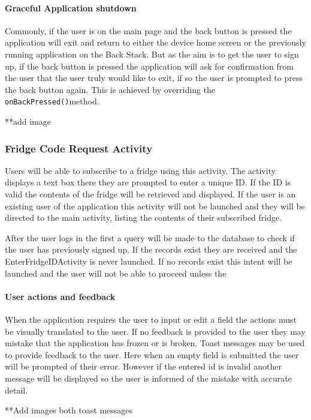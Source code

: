 \documentclass[a4paper, 11pt]{article}
\begin{document}
\paragraph{Graceful Application shutdown}
Commonly, if the user is on the main page and the back button is pressed the application will exit and return to either the device home screen or the previously running application on the Back Stack. But as the aim is to get the user to sign up, if the back button is pressed the application will ask for confirmation from the user that the user truly would like to exit, if so the user is prompted to press the back button again. This is achieved by overriding the \texttt{onBackPressed()}method. 

**add image


\subsubsection{Fridge Code Request Activity}
Users will be able to subscribe to a fridge using this activity. The activity displays a text box there they are prompted to enter a unique ID. If the ID is valid the contents of the fridge will be retrieved and displayed. If the user is an existing user of the application this activity will not be launched and they will be directed to the main activity, listing the contents of their subscribed fridge.

After the user logs in the first a query will be made to the database to check if the user has previously signed up. If the records exist they are received and the EnterFridgeIDActivity is never launched. If no records exist this intent will be launched and the user will not be able to proceed unless the 

\paragraph{User actions and feedback}
When the application requires the user to input or edit a field the actions must be visually translated to the user. If no feedback is provided to the user they may mistake that the application has frozen or is broken. Toast messages may be used to provide feedback to the user. Here when an empty field is submitted the user will be prompted of their error. However if the entered id is invalid another message will be displayed so the user is informed of the mistake with accurate detail. 

**Add images both toast messages
\end{document}
